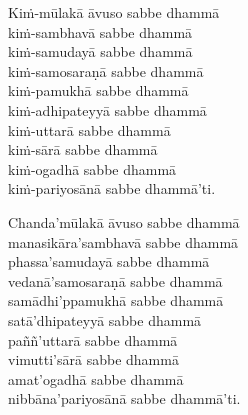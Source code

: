 

\begin{leader}
\end{leader}

\enlargethispage{2\baselineskip}

Kiṁ-mūlakā āvuso sabbe dhammā\\
kiṁ-sambhavā sabbe dhammā\\
kiṁ-samudayā sabbe dhammā\\
kiṁ-samosaraṇā sabbe dhammā\\
kiṁ-pamukhā sabbe dhammā\\
kiṁ-adhipateyyā sabbe dhammā\\
kiṁ-uttarā sabbe dhammā\\
kiṁ-sārā sabbe dhammā\\
kiṁ-ogadhā sabbe dhammā\\
kiṁ-pariyosānā sabbe dhammā'ti.

Chanda'mūlakā āvuso sabbe dhammā\\
manasikāra'sambhavā sabbe dhammā\\
phassa'samudayā sabbe dhammā\\
vedanā'samosaraṇā sabbe dhammā\\
samādhi'ppamukhā sabbe dhammā\\
satā'dhipateyyā sabbe dhammā\\
paññ'uttarā sabbe dhammā\\
vimutti'sārā sabbe dhammā\\
amat'ogadhā sabbe dhammā\\
nibbāna'pariyosānā sabbe dhammā'ti.

\clearpage

